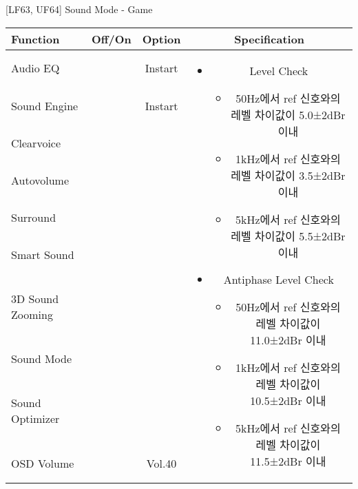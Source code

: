 \begin{frame}[t]{[LF63, UF64] Sound Mode - Game}
\begin{tiny}
\begin{tabular}{@{}lccc@{}}
\toprule
Function & Off/On & Option & Specification \\
\midrule
Audio EQ & \color{black}{Off} & Instart &
\multirow{10}{60mm}{
\begin{itemize}
\item Level Check
  \begin{itemize}
  \item 50Hz에서 ref 신호와의 레벨 차이값이 5.0±2dBr 이내
  \item 1kHz에서 ref 신호와의 레벨 차이값이 3.5±2dBr 이내
  \item 5kHz에서 ref 신호와의 레벨 차이값이 5.5±2dBr 이내
  \end{itemize}
\item Antiphase Level Check
  \begin{itemize}
  \item 50Hz에서 ref 신호와의 레벨 차이값이 11.0±2dBr 이내
  \item 1kHz에서 ref 신호와의 레벨 차이값이 10.5±2dBr 이내
  \item 5kHz에서 ref 신호와의 레벨 차이값이 11.5±2dBr 이내
  \end{itemize}
\end{itemize}
} \\
Sound Engine & \color{blue}{On} & Instart & \\
Clearvoice & \color{black}{Off} & & \\
Autovolume & \color{black}{Off} & & \\
Surround & \color{black}{Off} & & \\
Smart Sound & \color{black}{Off} & & \\
3D Sound Zooming & \color{black}{Off} & & \\
Sound Mode & \color{blue}{On} & \color{blue}{Game} & \\
Sound Optimizer & \color{black}{Off} & & \\
OSD Volume & \color{blue}{On} & Vol.40 & \\
\midrule
\end{tabular}
\end{tiny}

\end{frame}
